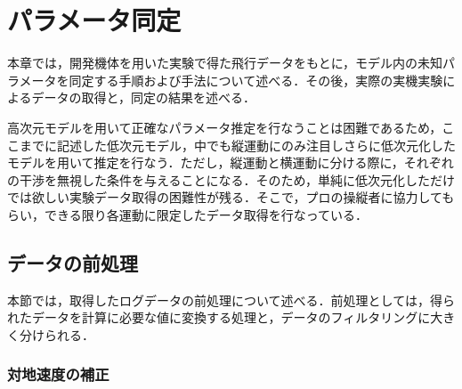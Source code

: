 
\chapter{パラメータ同定}
\label{sys_id}

本章では，開発機体を用いた実験で得た飛行データをもとに，モデル内の未知パラメータを同定する手順および手法について述べる．その後，実際の実機実験によるデータの取得と，同定の結果を述べる．

高次元モデルを用いて正確なパラメータ推定を行なうことは困難であるため，ここまでに記述した低次元モデル，中でも縦運動にのみ注目しさらに低次元化したモデルを用いて推定を行なう．ただし，縦運動と横運動に分ける際に，それぞれの干渉を無視した条件を与えることになる．そのため，単純に低次元化しただけでは欲しい実験データ取得の困難性が残る．そこで，プロの操縦者に協力してもらい，できる限り各運動に限定したデータ取得を行なっている．\label{da}

\section{データの前処理}
\label{sec:data_prepro}

本節では，取得したログデータの前処理について述べる．前処理としては，得られたデータを計算に必要な値に変換する処理と，データのフィルタリングに大きく分けられる．

\subsection{対地速度の補正}

